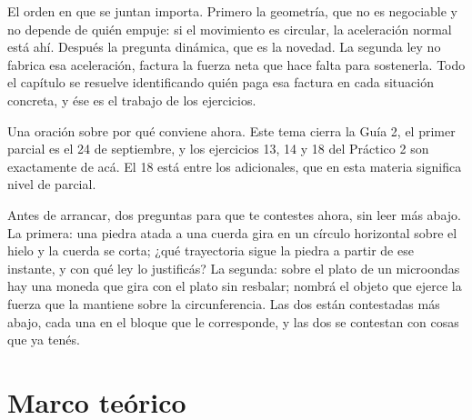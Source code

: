 \documentclass[11pt,openany]{book}
\begin{document}
El orden en que se juntan importa. Primero la geometría, que no es negociable y no depende de quién empuje: si el movimiento es circular, la aceleración normal está ahí. Después la pregunta dinámica, que es la novedad. La segunda ley no fabrica esa aceleración, factura la fuerza neta que hace falta para sostenerla. Todo el capítulo se resuelve identificando quién paga esa factura en cada situación concreta, y ése es el trabajo de los ejercicios.

Una oración sobre por qué conviene ahora. Este tema cierra la Guía 2, el primer parcial es el 24 de septiembre, y los ejercicios 13, 14 y 18 del Práctico 2 son exactamente de acá. El 18 está entre los adicionales, que en esta materia significa nivel de parcial.

Antes de arrancar, dos preguntas para que te contestes ahora, sin leer más abajo. La primera: una piedra atada a una cuerda gira en un círculo horizontal sobre el hielo y la cuerda se corta; ¿qué trayectoria sigue la piedra a partir de ese instante, y con qué ley lo justificás? La segunda: sobre el plato de un microondas hay una moneda que gira con el plato sin resbalar; nombrá el objeto que ejerce la fuerza que la mantiene sobre la circunferencia. Las dos están contestadas más abajo, cada una en el bloque que le corresponde, y las dos se contestan con cosas que ya tenés.

\section{Marco teórico}
\end{document}
